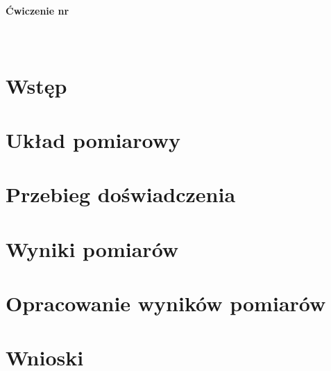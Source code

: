 \documentclass[a4paper,11pt]{article}
\begin{document}


\vspace{1cm}
\begin{center}
	\Huge{\textbf{\Temat}} \\
	\vspace{0.5cm}
	\Large{\textbf{Ćwiczenie nr \NrCwiczenia}} \\
	\vspace{0.5cm}
	\large{\PierwszyAutor} \\
	\large{\DrugiAutor} \\
	\vspace{1cm}
\end{center}

\tableofcontents

\newpage 
\section{Wstęp}



\section{Układ pomiarowy}



\section{Przebieg doświadczenia}



\section{Wyniki pomiarów}



\section{Opracowanie wyników pomiarów}



\section{Wnioski}


\end{document}
